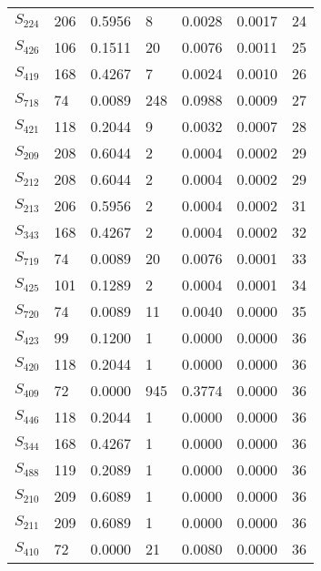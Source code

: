 \begin{xltabular}{\textwidth}{XPPPPPP}
  $S_{224}$ & 206 & 0.5956 & 8 & 0.0028 & 0.0017 & 24 \\ 
  $S_{426}$ & 106 & 0.1511 & 20 & 0.0076 & 0.0011 & 25 \\ 
  $S_{419}$ & 168 & 0.4267 & 7 & 0.0024 & 0.0010 & 26 \\ 
  $S_{718}$ & 74 & 0.0089 & 248 & 0.0988 & 0.0009 & 27 \\ 
  $S_{421}$ & 118 & 0.2044 & 9 & 0.0032 & 0.0007 & 28 \\ 
  $S_{209}$ & 208 & 0.6044 & 2 & 0.0004 & 0.0002 & 29 \\ 
  $S_{212}$ & 208 & 0.6044 & 2 & 0.0004 & 0.0002 & 29 \\ 
  $S_{213}$ & 206 & 0.5956 & 2 & 0.0004 & 0.0002 & 31 \\ 
  $S_{343}$ & 168 & 0.4267 & 2 & 0.0004 & 0.0002 & 32 \\ 
  $S_{719}$ & 74 & 0.0089 & 20 & 0.0076 & 0.0001 & 33 \\ 
  $S_{425}$ & 101 & 0.1289 & 2 & 0.0004 & 0.0001 & 34 \\ 
  $S_{720}$ & 74 & 0.0089 & 11 & 0.0040 & 0.0000 & 35 \\ 
  $S_{423}$ & 99 & 0.1200 & 1 & 0.0000 & 0.0000 & 36 \\ 
  $S_{420}$ & 118 & 0.2044 & 1 & 0.0000 & 0.0000 & 36 \\ 
  $S_{409}$ & 72 & 0.0000 & 945 & 0.3774 & 0.0000 & 36 \\ 
  $S_{446}$ & 118 & 0.2044 & 1 & 0.0000 & 0.0000 & 36 \\ 
  $S_{344}$ & 168 & 0.4267 & 1 & 0.0000 & 0.0000 & 36 \\ 
  $S_{488}$ & 119 & 0.2089 & 1 & 0.0000 & 0.0000 & 36 \\ 
  $S_{210}$ & 209 & 0.6089 & 1 & 0.0000 & 0.0000 & 36 \\ 
  $S_{211}$ & 209 & 0.6089 & 1 & 0.0000 & 0.0000 & 36 \\ 
  $S_{410}$ & 72 & 0.0000 & 21 & 0.0080 & 0.0000 & 36 \\
        \bottomrule
    \end{xltabular}
    
